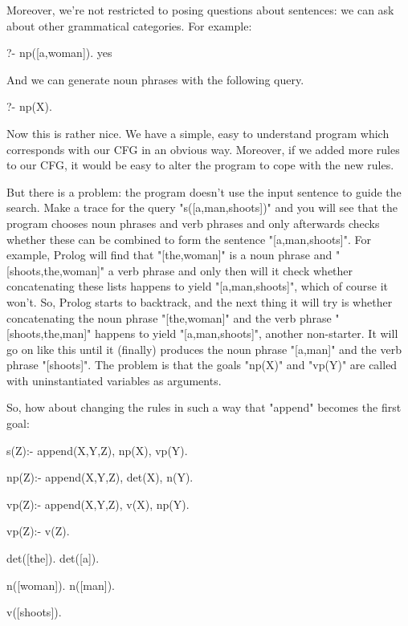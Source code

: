 Moreover, we're not restricted to posing questions about sentences: we
can ask about other grammatical categories. For example:
\begin{LPNcodedisplay}
?- np([a,woman]).
yes
\end{LPNcodedisplay}

And we can generate noun phrases with the following query.
\begin{LPNcodedisplay}
?- np(X).
\end{LPNcodedisplay}


Now this is rather nice.  We have a simple, easy to understand program
which corresponds with our CFG in an obvious way.  Moreover, if we
added more rules to our CFG, it would be easy to alter the program to
cope with the new rules.

But there is a problem: the program doesn't use the input sentence to
guide the search. Make a trace for the query "s([a,man,shoots])"
and you will see that the program chooses
noun phrases and verb
phrases and only afterwards checks whether these can be combined to
form the sentence "[a,man,shoots]". For example, Prolog will find that
"[the,woman]" is a noun phrase and "[shoots,the,woman]" a
verb phrase and only then will it check whether concatenating these
lists happens to yield "[a,man,shoots]", which of course
it won't. So, Prolog starts to backtrack, and the next thing it will try
is whether concatenating the noun phrase "[the,woman]" and the
verb phrase "[shoots,the,man]" happens to yield
"[a,man,shoots]", another non-starter.
It will go on like this until it (finally)
produces the noun phrase "[a,man]" and the verb phrase
"[shoots]". The problem is that the goals
"np(X)" and "vp(Y)" are called with uninstantiated variables
as arguments.

So, how about changing the rules in such a way that "append"
becomes the first goal:
\begin{LPNcodedisplay}
s(Z):- append(X,Y,Z), np(X), vp(Y).

np(Z):- append(X,Y,Z), det(X), n(Y).

vp(Z):-  append(X,Y,Z), v(X), np(Y).

vp(Z):-  v(Z).

det([the]).
det([a]).

n([woman]).
n([man]).

v([shoots]).
\end{LPNcodedisplay}

